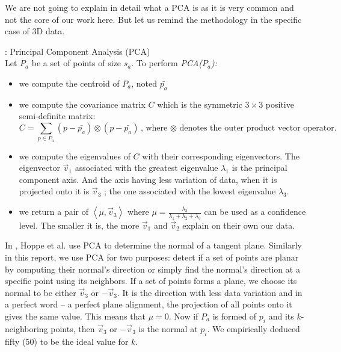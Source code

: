 We are not going to explain in detail what a PCA is as it is very common and not the core of our work here. But let us remind the methodology in the specific case of 3D data.

\begin{definition}{: Principal Component Analysis (PCA)}
\\ Let $P_a$ be a set of points of size $s_a$. To perform \textit{PCA($P_a$):}
\begin{itemize}
\item we compute the centroid of $P_a$, noted $\bar{p_a}$
\item we compute the covariance matrix $C$ which is the symmetric $3 \times 3$ positive semi-definite matrix:
\begin{equation*}
C = \sum_{p \in P_a} (p - \bar{p_a}) \otimes (p - \bar{p_a}) \text{,       where $\otimes$ denotes the outer product vector operator.}
\end{equation*}
\item we compute the eigenvalues of $C$ with their corresponding eigenvectors. The eigenvector $\vec{v}_1$  associated with the greatest eigenvalue $\lambda_1$  is the principal component axis. And the axis having less variation of data, when it is projected onto it is $\vec{v}_3$ ; the one associated with the lowest eigenvalue $\lambda_3$.
\item we return a pair of $\left\langle \mu, \vec{v}_3 \right\rangle$ where $\mu = \frac{\lambda_3}{\lambda_1 + \lambda_2 + \lambda_3}$ can be used as a confidence level. The smaller it is, the more $\vec{v}_1$ and $\vec{v}_2$  explain on their own our data.
\end{itemize}
\end{definition}

In \cite{hoppe}, Hoppe et al. use PCA to determine the normal of a tangent plane. Similarly in this report, we use PCA for two purposes: detect if a set of points are planar by computing their normal's direction or simply find the normal's direction at a specific point using its neighbors. If a set of points forms a plane, we choose its normal to be either $\vec{v}_3$ or $-\vec{v}_3$. It is the direction with less data variation and in a perfect word -- a perfect plane alignment, the projection of all points onto it gives the same value. This means that  $\mu = 0$. Now if $P_a$ is formed of $p_i$ and its $k$-neighboring points, then $\vec{v}_3$ or $-\vec{v}_3$ is the normal at $p_i$. We empirically deduced fifty (50) to be the ideal value for $k$.


